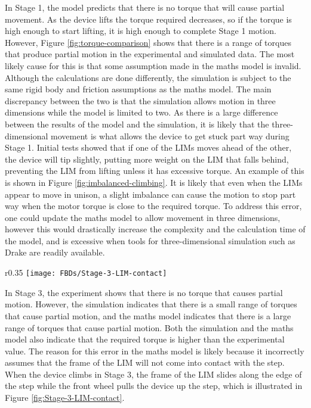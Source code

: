In Stage 1, the model predicts that there is no torque that will cause partial movement. As the device lifts the torque required decreases, so if the torque is high enough to start lifting, it is high enough to complete Stage 1 motion. However, Figure \ref{fig:torque-comparison} shows that there is a range of torques that produce partial motion in the experimental and simulated data. The most likely cause for this is that some assumption made in the maths model is invalid. Although the calculations are done differently, the simulation is subject to the same rigid body and friction assumptions as the maths model. The main discrepancy between the two is that the simulation allows motion in three dimensions while the model is limited to two. As there is a large difference between the results of the model and the simulation, it is likely that the three-dimensional movement is what allows the device to get stuck part way during Stage 1. Initial tests showed that if one of the LIMs moves ahead of the other, the device will tip slightly, putting more weight on the LIM that falls behind, preventing the LIM from lifting unless it has excessive torque. An example of this is shown in Figure \ref{fig:imbalanced-climbing}. It is likely that even when the LIMs appear to move in unison, a slight imbalance can cause the motion to stop part way when the motor torque is close to the required torque. To address this error, one could update the maths model to allow movement in three dimensions, however this would drastically increase the complexity and the calculation time of the model, and is excessive when tools for three-dimensional simulation such as Drake are readily available.\\

\begin{wrapfigure}{r}{0.35\textwidth}
	\centering
	\texttt{[image: FBDs/Stage-3-LIM-contact]}
	\caption{Frame of the LIM making contact with the edge of the step in Stage 3}
	\label{fig:Stage-3-LIM-contact}
\end{wrapfigure}
In Stage 3, the experiment shows that there is no torque that causes partial motion. However, the simulation indicates that there is a small range of torques that cause partial motion, and the maths model indicates that there is a large range of torques that cause partial motion. Both the simulation and the maths model also indicate that the required torque is higher than the experimental value. The reason for this error in the maths model is likely because it incorrectly assumes that the frame of the LIM will not come into contact with the step. When the device climbs in Stage 3, the frame of the LIM slides along the edge of the step while the front wheel pulls the device up the step, which is illustrated in Figure \ref{fig:Stage-3-LIM-contact}. \\

